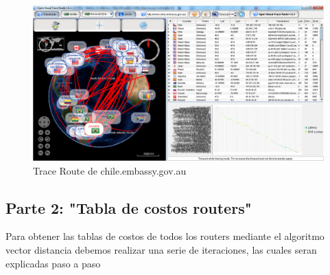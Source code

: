 \documentclass{article}
\begin{document}
\begin{description}
\begin{figure}[h!]
\centering
\includegraphics[scale=0.30]{traceroute_australia.png}
\caption{Trace Route de chile.embassy.gov.au}
\label{fig:embajadaChilena}
\end{figure}  

\end{description}

\clearpage

\subsection{Parte 2: "Tabla de costos routers"}
Para obtener las tablas de costos de todos los routers mediante el algoritmo vector distancia debemos realizar una serie de iteraciones, las cuales seran explicadas paso a paso
\end{document}

